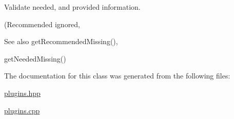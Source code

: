 Validate needed, and provided information. 

(Recommended ignored, \begin{DoxySeeAlso}{See also}
get\+Recommended\+Missing(), 

get\+Needed\+Missing() 
\end{DoxySeeAlso}


The documentation for this class was generated from the following files\+:\begin{DoxyCompactItemize}
\item 
\hyperlink{plugins_8hpp}{plugins.\+hpp}\item 
\hyperlink{plugins_8cpp}{plugins.\+cpp}\end{DoxyCompactItemize}
